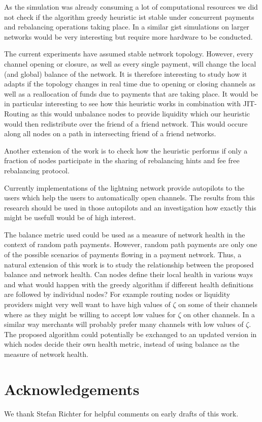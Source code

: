 \documentclass[a4paper]{paper}
\begin{document}
As the simulation was already consuming a lot of computational resources we did not check if the algorithm greedy heuristic ist stable under concurrent payments and rebalancing operations taking place.
In a similar gist simulations on larger networks would be very interesting but require more hardware to be conducted.

The current experiments have assumed stable network topology. 
However, every channel opening or closure, as well as every single payment, will change the local (and global) balance of the network.
It is therefore interesting to study how it adapts if the topology changes in real time due to opening or closing channels as well as a reallocation of funds due to payments that are taking place.
It would be in particular interesting to see how this heuristic works in combination with JIT-Routing as this would unbalance nodes to provide liquidity which our heuristic would then redistribute over the friend of a friend network.
This would occure along all nodes on a path in intersecting friend of a friend networks.

Another extension of the work is to check how the heuristic performs if only a fraction of nodes participate in the sharing of rebalancing hints and fee free rebalancing protocol.

Currently implementations of the lightning network provide autopilots to the users which help the users to automatically open channels.
The results from this research should be used in those autopilots and an investigation how exactly this might be usefull would be of high interest.

The balance metric used could be used as a measure of network health in the context of random path payments. 
However, random path payments are only one of the possible scenarios of payments flowing in a payment network. 
Thus, a natural extension of this work is to 
study the relationship between the proposed balance and network health. Can nodes define their local health in various ways and what would happen with the greedy algorithm if different health definitions are followed by individual nodes?
For example routing nodes or liquidity providers might very well want to have high values of $\zeta$ on some of their channels where as they might be willing to accept low values for $\zeta$ on other channels.
In a similar way merchants will probably prefer many channels with low values of $\zeta$.
The proposed algorithm could potentially be exchanged to an updated version in which nodes decide their own health metric,
instead of using balance as the measure of network health.

\section{Acknowledgements}
\label{sec:ack}
We thank Stefan Richter for helpful comments on early drafts of this work.




\end{document}
